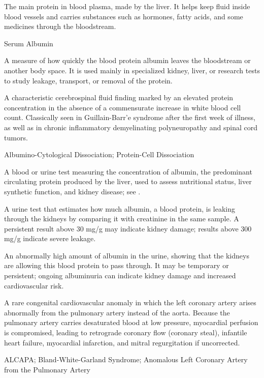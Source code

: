  The main protein in blood plasma, made by the liver. It helps keep fluid inside blood vessels and carries substances such as hormones, fatty acids, and some medicines through the bloodstream.

\synonyms
Serum Albumin

 A measure of how quickly the blood protein albumin leaves the bloodstream or another body space. It is used mainly in specialized kidney, liver, or research tests to study leakage, transport, or removal of the protein.

 A characteristic cerebrospinal fluid finding marked by an elevated protein concentration in the absence of a commensurate increase in white blood cell count. Classically seen in Guillain-Barr'{e} syndrome after the first week of illness, as well as in chronic inflammatory demyelinating polyneuropathy and spinal cord tumors.

\synonyms
Albumino-Cytological Dissociation; Protein-Cell Dissociation

 A blood or urine test measuring the concentration of albumin, the predominant circulating protein produced by the liver, used to assess nutritional status, liver synthetic function, and kidney disease; see .

 A urine test that estimates how much albumin, a blood protein, is leaking through the kidneys by comparing it with creatinine in the same sample. A persistent result above 30 mg/g may indicate kidney damage; results above 300 mg/g indicate severe leakage.

 An abnormally high amount of albumin in the urine, showing that the kidneys are allowing this blood protein to pass through. It may be temporary or persistent; ongoing albuminuria can indicate kidney damage and increased cardiovascular risk.

 A rare congenital cardiovascular anomaly in which the left coronary artery arises abnormally from the pulmonary artery instead of the aorta. Because the pulmonary artery carries desaturated blood at low pressure, myocardial perfusion is compromised, leading to retrograde coronary flow (coronary steal), infantile heart failure, myocardial infarction, and mitral regurgitation if uncorrected.

\synonyms
ALCAPA; Bland-White-Garland Syndrome; Anomalous Left Coronary Artery from the Pulmonary Artery

